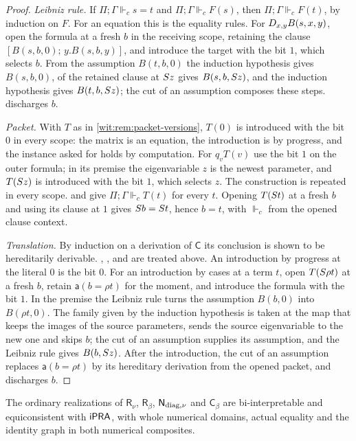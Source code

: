\begin{proof}
\emph{Leibniz rule.}  If $\Pi;\Gamma\Vdash_{c}s=t$ and
$\Pi;\Gamma\Vdash_{c}F(s)$, then $\Pi;\Gamma\Vdash_{c}F(t)$, by induction on
$F$.  For an equation this is the equality rules.  For
$D_{x,y}B(s,x,y)$, open the formula at a fresh $b$ in the receiving scope,
retaining the clause $[B(s,b,0);\,y.B(s,b,y)]$, and introduce the target
with the bit $1$, which selects $b$.  From the assumption $B(t,b,0)$ the
induction hypothesis gives $B(s,b,0)$,  of the retained
clause at $S z$ gives $B(s,b,S z)$, and the induction hypothesis
gives $B(t,b,S z)$; the cut of an assumption composes these steps.
 discharges $b$.

\emph{Packet.}  With $T$ as in \cref{wit:rem:packet-versions}, $T(0)$ is
introduced with the bit $0$ in every scope: the matrix is an equation, the
introduction is by progress, and the instance asked for holds by
computation.  For $q_vT(v)$ use the bit $1$ on the outer formula; in its
premise the eigenvariable $z$ is the newest parameter, and $T(S z)$ is
introduced with the bit $1$, which selects $z$.  The construction is
repeated in every scope.   and  give
$\Pi;\Gamma\Vdash_{c}T(t)$ for every $t$.  Opening $T(S t)$ at a fresh
$b$ and using its clause at $1$ gives $S b=S t$, hence $b=t$, with
$\Vdash_{c}$ from the opened clause context.

\emph{Translation.}  By induction on a derivation of $\mathsf{C}$ its
conclusion is shown to be hereditarily derivable.  ,
,  and  are treated above.  An
introduction by progress at the literal $0$ is the bit $0$.  For an
introduction by cases at a term $t$, open $T(S\rho t)$ at a fresh $b$,
retain $\mathsf{a}(b=\rho t)$ for the moment, and introduce the formula with
the bit $1$.  In the premise the Leibniz rule turns the assumption
$B(b,0)$ into $B(\rho t,0)$.  The family given by the induction hypothesis
is taken at the map that keeps the images of the source parameters, sends
the source eigenvariable to the new one and skips $b$; the cut of an
assumption supplies its assumption, and the Leibniz rule gives
$B(b,S z)$.  After the introduction, the cut of an assumption replaces
$\mathsf{a}(b=\rho t)$ by its hereditary derivation from the opened packet,
and  discharges $b$.
\end{proof}

\begin{corollary}
\label{wit:cor:clause-bridge}
The ordinary realizations of $\mathsf{R}_{\nu}$, $\mathsf{R}_{\beta}$,
$\mathsf{N}_{\mathrm{diag},\nu}$ and $\mathsf{C}_{\beta}$ are bi-interpretable and
equiconsistent with $\mathsf{iPRA}$, with whole numerical domains, actual equality
and the identity graph in both numerical composites.
\end{corollary}

